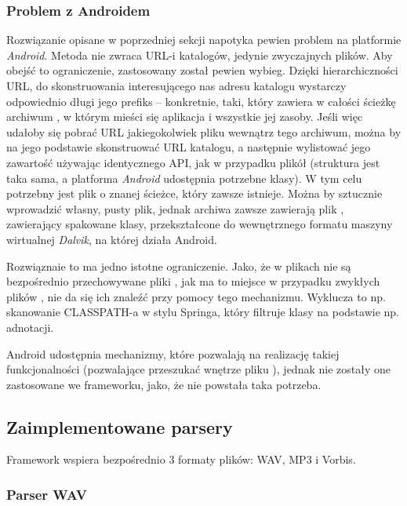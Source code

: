 \subsubsection{Problem z Androidem}

Rozwiązanie opisane w poprzedniej sekcji napotyka pewien problem na platformie \emph{Android}.
Metoda  nie zwraca URL-i katalogów, jedynie zwyczajnych plików. Aby
obejść to ograniczenie, zastosowany został pewien wybieg. Dzięki hierarchiczności URL, do
skonstruowania interesującego nas adresu katalogu wystarczy odpowiednio długi jego prefiks --
konkretnie, taki, który zawiera w całości ścieżkę archiwum , w którym mieści się
aplikacja i wszystkie jej zasoby. Jeśli więc udałoby się pobrać URL jakiegokolwiek pliku wewnątrz
tego archiwum, można by na jego podstawie skonstruować URL katalogu, a następnie wylistować jego
zawartość używając identycznego API, jak w przypadku plikół  (struktura jest taka sama, a
platforma \emph{Android} udostępnia potrzebne klasy). W tym celu potrzebny jest plik o znanej
ścieżce, który zawsze istnieje. Można by sztucznie wprowadzić własny, pusty plik, jednak archiwa
 zawsze zawierają plik , zawierający spakowane klasy, przekształcone do
wewnętrznego formatu maszyny wirtualnej \emph{Dalvik}, na której działa Android.

Rozwiąznaie to ma jedno istotne ograniczenie. Jako, że w plikach  nie są bezpośrednio
przechowywane pliki , jak ma to miejsce w przypadku zwykłych plików , nie da
się ich znaleźć przy pomocy tego mechanizmu. Wyklucza to np. skanowanie CLASSPATH-a w stylu Springa,
który filtruje klasy na podstawie np. adnotacji. 

\begin{Note}
Android udostępnia mechanizmy, które pozwalają na realizację takiej funkcjonalności (pozwalające
przeszukać wnętrze pliku ), jednak nie zostały one zastosowane we frameworku,
jako, że nie powstała taka potrzeba.  
\end{Note}


\subsection{Zaimplementowane parsery}

Framework wspiera bezpośrednio 3 formaty plików: WAV, MP3 i Vorbis.

\subsubsection{Parser WAV}

